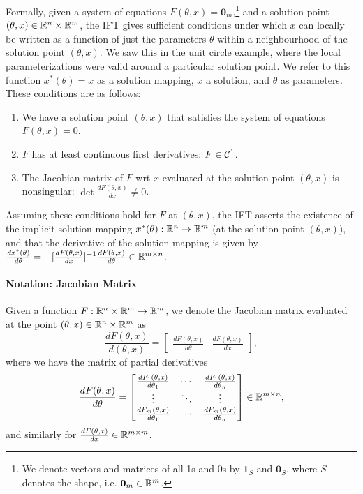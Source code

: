 \documentclass[11pt]{article}
\begin{document}
Formally, given a system of equations $F(\theta, x) = \mathbf{0}_m$,\footnote{
We denote vectors and matrices of all 1s and 0s by $\mathbf{1}_S$
and $\mathbf{0}_S$, where $S$ denotes the shape, i.e. $\mathbf{0}_m\in\mathbb{R}^m$.
}
and a solution point $(\theta,x) \in \mathbb{R}^n\times\mathbb{R}^m$,
the IFT gives sufficient conditions under which $x$ can locally be written as a function
of just the parameters $\theta$ within a neighbourhood of the solution point $(\theta,x)$.
We saw this in the unit circle example, where the local parameterizations were
valid around a particular solution point.
We refer to this function $x^*(\theta) = x$ as a solution mapping,
$x$ a solution, and $\theta$ as parameters.
These conditions are as follows:
\begin{enumerate}
\item We have a solution point $(\theta, x)$ that satisfies the system of equations
    $F(\theta, x) = 0$.
\item $F$ has at least continuous first derivatives: $F \in \mathcal{C}^1$.
\item The Jacobian matrix
    of $F$ wrt $x$ evaluated at the solution point $(\theta,x)$ is nonsingular:
    $\det \frac{d F(\theta,x)}{d x} \neq 0$.
\end{enumerate}
Assuming these conditions hold for $F$ at $(\theta,x)$, the IFT
asserts the existence of the implicit solution mapping $x^*(\theta):\mathbb{R}^n\to\mathbb{R}^m$
(at the solution point $(\theta,x)$),
and that the derivative of the solution mapping is given by
$\frac{d x^*(\theta)}{d\theta} = -[\frac{dF(\theta,x)}{dx}]^{-1}
    \frac{d F(\theta,x)}{d\theta} \in \mathbb{R}^{m\times n}$.

\paragraph{Notation: Jacobian Matrix}
Given a function $F:\mathbb{R}^n\times\mathbb{R}^m\to\mathbb{R}^m$, we denote the Jacobian matrix evaluated at
the point $(\theta,x)\in\mathbb{R}^n\times\mathbb{R}^m$ as
\begin{equation*}
\frac{dF(\theta,x)}{d(\theta,x)} = \begin{bmatrix}
    \frac{dF(\theta,x)}{d\theta} &\frac{dF(\theta,x)}{dx} 
\end{bmatrix},
\end{equation*}
where we have the matrix of partial derivatives
\begin{equation*}
\frac{dF(\theta,x)}{d\theta} = \begin{bmatrix}
    \frac{dF_1(\theta,x)}{d\theta_1} & \cdots & \frac{dF_1(\theta,x)}{d\theta_n} \\
    \vdots & \ddots & \vdots \\
    \frac{dF_m(\theta,x)}{d\theta_1} & \cdots & \frac{dF_m(\theta,x)}{d\theta_n} \\
\end{bmatrix}\in\mathbb{R}^{m\times n},
\end{equation*}
and similarly for $\frac{dF(\theta,x)}{dx}\in\mathbb{R}^{m\times m}$.
\end{document}

